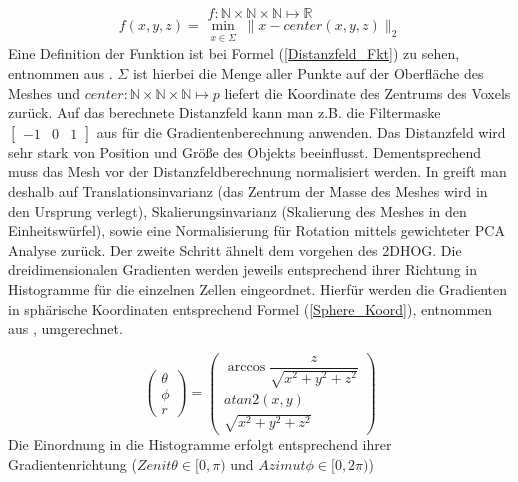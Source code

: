 \begin{equation*}
f: \mathbb{N} \times \mathbb{N} \times \mathbb{N} \mapsto \mathbb{R} 
\end{equation*}
\begin{equation}
\label{Distanzfeld_Fkt}
f(x,y,z) = \min_{\substack{x \in \Sigma}} \| x-center(x,y,z) \|_2
\end{equation}
Eine Definition der Funktion ist bei Formel (\ref{Distanzfeld_Fkt}) zu sehen, entnommen aus \cite{scherer2010histograms}. $\Sigma$ ist hierbei die Menge aller Punkte auf der Oberfläche des Meshes und $center: \mathbb{N} \times \mathbb{N} \times \mathbb{N} \mapsto p $ liefert die Koordinate des Zentrums des Voxels zurück.
\newline
Auf das berechnete Distanzfeld kann man z.B. die Filtermaske $\begin{bmatrix} -1 & 0 & 1\end{bmatrix}$ aus \cite{dalal2005histograms} für die Gradientenberechnung anwenden.
\newline
Das Distanzfeld wird sehr stark von Position und Größe des Objekts beeinflusst. Dementsprechend muss das Mesh vor der Distanzfeldberechnung normalisiert werden. In \cite{scherer2010histograms} greift man deshalb auf Translationsinvarianz  (das Zentrum der Masse des Meshes wird in den Ursprung verlegt), Skalierungsinvarianz (Skalierung des Meshes in den Einheitswürfel), sowie eine Normalisierung für Rotation mittels gewichteter PCA Analyse zurück.
\newline
Der zweite Schritt ähnelt dem vorgehen des 2DHOG. Die dreidimensionalen Gradienten werden jeweils entsprechend ihrer Richtung in Histogramme für die einzelnen Zellen eingeordnet. Hierfür werden die Gradienten in sphärische Koordinaten entsprechend Formel (\ref{Sphere_Koord}), entnommen aus \cite{scherer2010histograms}, umgerechnet.

\begin{equation}
\label{Sphere_Koord}
\begin{pmatrix}
	\theta \\ 
	 \phi \\ 
	 r
\end{pmatrix}
= \begin{pmatrix}
	\arccos\dfrac{z}{\sqrt{x^2+y^2+z^2}} \\ 
	 atan2(x,y) \\ 
	 \sqrt{x^2+y^2+z^2}
\end{pmatrix}
\end{equation}
Die Einordnung in die Histogramme erfolgt entsprechend ihrer Gradientenrichtung ($Zenit \theta \in [0,\pi) $ und $Azimut \phi \in [0,2\pi)$)  

